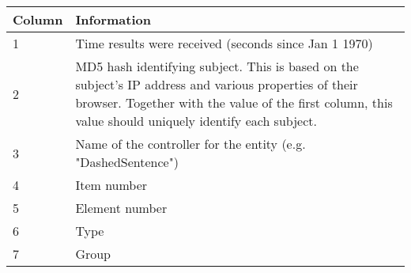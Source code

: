 \documentclass[
]{article}
\begin{document}
\begin{RaggedRight}\small\begin{longtable}[]{p{1.7in}p{4.3in}}
\toprule
\begin{minipage}[b]{0.14\columnwidth}\raggedright
\textbf{Column}\strut
\end{minipage} & \begin{minipage}[b]{0.80\columnwidth}\raggedright
\textbf{Information}\strut
\end{minipage}\tabularnewline
\midrule
\endhead
\begin{minipage}[t]{0.14\columnwidth}\raggedright
1\strut
\end{minipage} & \begin{minipage}[t]{0.80\columnwidth}\raggedright
Time results were received (seconds since Jan 1 1970)\strut
\end{minipage}\tabularnewline
\begin{minipage}[t]{0.14\columnwidth}\raggedright
2\strut
\end{minipage} & \begin{minipage}[t]{0.80\columnwidth}\raggedright
MD5 hash identifying subject. This is based on the subject's IP address
and various properties of their browser. Together with the value of the
first column, this value should uniquely identify each subject.\strut
\end{minipage}\tabularnewline
\begin{minipage}[t]{0.14\columnwidth}\raggedright
3\strut
\end{minipage} & \begin{minipage}[t]{0.80\columnwidth}\raggedright
Name of the controller for the entity (e.g. "DashedSentence")\strut
\end{minipage}\tabularnewline
\begin{minipage}[t]{0.14\columnwidth}\raggedright
4\strut
\end{minipage} & \begin{minipage}[t]{0.80\columnwidth}\raggedright
Item number\strut
\end{minipage}\tabularnewline
\begin{minipage}[t]{0.14\columnwidth}\raggedright
5\strut
\end{minipage} & \begin{minipage}[t]{0.80\columnwidth}\raggedright
Element number\strut
\end{minipage}\tabularnewline
\begin{minipage}[t]{0.14\columnwidth}\raggedright
6\strut
\end{minipage} & \begin{minipage}[t]{0.80\columnwidth}\raggedright
Type\strut
\end{minipage}\tabularnewline
\begin{minipage}[t]{0.14\columnwidth}\raggedright
7\strut
\end{minipage} & \begin{minipage}[t]{0.80\columnwidth}\raggedright
Group\strut
\end{minipage}\tabularnewline
\bottomrule
\end{longtable}\normalsize\end{RaggedRight}
\end{document}
